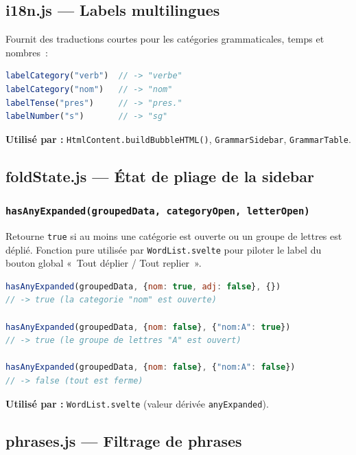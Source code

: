 \subsection{i18n.js --- Labels multilingues}

Fournit des traductions courtes pour les catégories grammaticales, temps et nombres~:

\begin{lstlisting}[language=javascript]
labelCategory("verb")  // -> "verbe"
labelCategory("nom")   // -> "nom"
labelTense("pres")     // -> "pres."
labelNumber("s")       // -> "sg"
\end{lstlisting}

\textbf{Utilisé par :} \texttt{HtmlContent.buildBubbleHTML()}, \texttt{GrammarSidebar}, \texttt{GrammarTable}.

\subsection{foldState.js --- État de pliage de la sidebar}

\subsubsection{\texttt{hasAnyExpanded(groupedData, categoryOpen, letterOpen)}}

Retourne \texttt{true} si au moins une catégorie est ouverte ou un groupe de lettres est déplié. Fonction pure utilisée par \texttt{WordList.svelte} pour piloter le label du bouton global «~Tout déplier / Tout replier~».

\begin{lstlisting}[language=javascript]
hasAnyExpanded(groupedData, {nom: true, adj: false}, {})
// -> true (la categorie "nom" est ouverte)

hasAnyExpanded(groupedData, {nom: false}, {"nom:A": true})
// -> true (le groupe de lettres "A" est ouvert)

hasAnyExpanded(groupedData, {nom: false}, {"nom:A": false})
// -> false (tout est ferme)
\end{lstlisting}

\textbf{Utilisé par :} \texttt{WordList.svelte} (valeur dérivée \texttt{anyExpanded}).

\subsection{phrases.js --- Filtrage de phrases}

